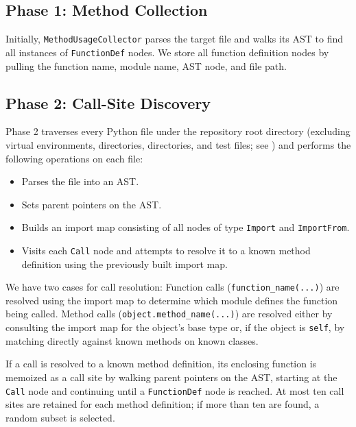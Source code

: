 \documentclass[12pt]{report}
\begin{document}
\subsection{Phase 1: Method Collection}

Initially, \texttt{MethodUsageCollector} parses the target file and walks its AST to find all instances of \texttt{FunctionDef} nodes. We store all function definition nodes by pulling the function name, module name, AST node, and file path. 

\subsection{Phase 2: Call-Site Discovery}

Phase 2 traverses every Python file under the repository root directory (excluding virtual environments,  directories,  directories, and test files; see ) and performs the following operations on each file:

\begin{itemize}

\item Parses the file into an AST.
\item Sets parent pointers on the AST.
\item Builds an import map consisting of all nodes of type \texttt{Import} and \texttt{ImportFrom}.
\item Visits each \texttt{Call} node and attempts to resolve it to a known method definition using the previously built import map.

\end{itemize}

We have two cases for call resolution: Function calls (\texttt{function\_name(...)}) are resolved using the import map to determine which module defines the function being called. Method calls (\texttt{object.method\_name(...)}) are resolved either by consulting the import map for the object's base type or, if the object is \texttt{self}, by matching directly against known methods on known classes.

If a call is resolved to a known method definition, its enclosing function is memoized as a call site by walking parent pointers on the AST, starting at the \texttt{Call} node and continuing until a \texttt{FunctionDef} node is reached. At most ten call sites are retained for each method definition; if more than ten are found, a random subset is selected.
\end{document}
